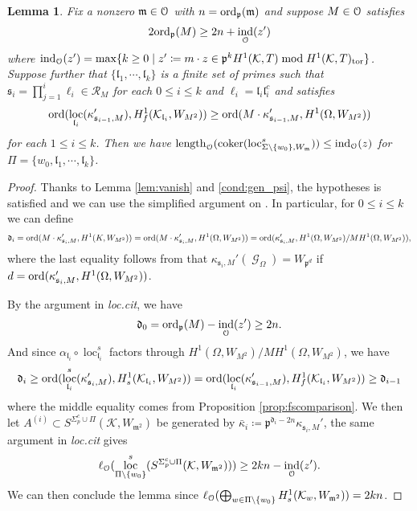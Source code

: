 \documentclass[leqno]{amsart}
\newtheorem{lem}[thm]{Lemma}
\theoremstyle{definition}
\theoremstyle{remark}
\newcommand{\eo}{\EuScript{O}}
\newcommand{\dd}{\mathfrak{d}} %
\DeclareMathOperator{\coker}{coker}
\DeclareMathOperator{\ind}{ind} %
\DeclareMathOperator{\length}{length}
\DeclareMathOperator{\Gal}{\mathcal{G}}
\newcommand{\fl}{\mathfrak{l}}
\newcommand{\fm}{\mathfrak{m}}
\newcommand{\fp}{\mathfrak{p}}
\newcommand{\fs}{\mathfrak{s}}
\newcommand{\K}{{\mathcal{K}}} %
\newcommand{\ord}{\textnormal{ord}} %
\DeclareMathOperator{\loc}{loc}
\begin{document}
\begin{lem}
Fix a nonzero $\fm\in \eo$ with $n=\ord_\fp(\fm)$ 
and suppose $M\in \eo$ satisfies
\[
    2\ord_\fp(M)\geq 2n+\ind_\eo(z')
\]
where 
$\ind_\eo(z')=\max\{k\geq 0\mid z'\coloneqq m\cdot z\in 
\fp^k H^1(\K, T)\bmod H^1(\K,T)_{\textnormal{tor}}\}$.
Suppose further that $\{\fl_1,\cdots,\fl_k\}$ 
is a finite set of primes such that
$\fs_i=\prod_{j=1}^i\ell_i\in \mathcal{R}_M$
for each $0\leq i\leq k$ and $\ell_i=\fl_i\fl_i^c$ and satisfies 
\[
\textnormal{ord}( \loc_{\fl_i}(\kappa_{\fs_{i-1},M}'),
H^1_f(\K_{\fl_i}, W_{M^2}))\geq
\textnormal{ord}( M\cdot \kappa_{\fs_{i-1},M}', H^1(\Omega,W_{M^2}))
\]
for each $1\leq i\leq k$.
Then we have 
$\length_{\eo}(\coker(\loc_{\Sigma\setminus\{w_0\},W_{\fm}}^s))
\leq \ind_{\eo}(z)$
for $\Pi=\{w_0, \fl_1,\cdots, \fl_k\}$.
\end{lem}
\begin{proof}
Thanks to Lemma \ref{lem:vanish} and \eqref{cond:gen_psi},
the hypotheses \cite[(5.5) p.109]{Rubin} is satisfied 
and we can use the simplified argument on \cite[p.110]{Rubin}.
In particular, for $0\leq i\leq k$ we can define
\[
    \dd_i=\ord(M\cdot \kappa_{\fs_i,M}', H^1(K,W_{M^2}))=
    \ord(M\cdot \kappa_{\fs_i,M}', H^1(\Omega,W_{M^2}))=
    \ord(\kappa_{\fs_i,M}', H^1(\Omega,W_{M^2})/MH^1(\Omega,W_{M^2})),
\]
where the last equality follows from that 
$\kappa_{\fs_i,M}'(\Gal_\Omega)=W_{\fp^d}$ if 
$d=\ord(\kappa_{\fs_i,M}', H^1(\Omega,W_{M^2}))$.

By the argument in \textit{loc.cit}, we have
\[
    \dd_0=\ord_\fp(M)-\ind_\eo(z')\geq 2n.
\]
And since $\alpha_{\fl_i}\circ \loc_{\fl_i}^s$
factors through $H^1(\Omega,W_{M^2})/MH^1(\Omega,W_{M^2})$, we have
\[
    \dd_i\geq 
    \ord(\loc^s_{\fl_i}(\kappa_{\fs_i,M}'),H^1_s(\K_{\fl_i}, W_{M^2}))=
    \ord(\loc_{\fl_i}(\kappa_{\fs_{i-1},M}'),H^1_f(\K_{\fl_i}, W_{M^2}))
    \geq \dd_{i-1}
\]
where the middle equality comes from Proposition \ref{prop:fscomparison}.
We then let $A^{(i)}\subset S^{\Sigma_p^c\cup \Pi}(\K, W_{\fm^2})$
be generated by $\bar{\kappa}_i\coloneqq \fp^{\dd_i-2n}\kappa_{\fs_i,M}'$,
the same argument in \textit{loc.cit} gives
\[
    \ell_\eo(\loc^s_{\Pi\setminus\{w_0\}}
    (S^{\Sigma_p^c\cup \Pi}(\K, W_{\fm^2})))\geq 2kn-\ind_\eo(z').
\]
We can then conclude the lemma since
$\ell_\eo(\bigoplus_{w\in\Pi\setminus\{w_0\}}H^1_s(\K_w, W_{\fm^2}))=2kn$.

\end{proof}
\end{document}
